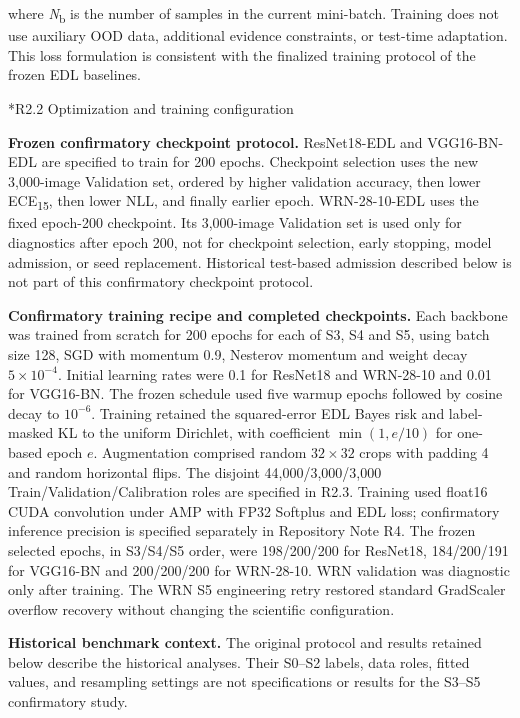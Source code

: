 \documentclass[11pt,a4paper]{article}
\makeatletter
\renewcommand\subsection{\@startsection{subsection}{2}{\z@}{-1.8ex plus -.5ex minus -.2ex}{.7ex plus .2ex}{\normalfont\normalsize\bfseries\raggedright}}
\makeatother
\begin{document}
where \emph{N}\textsubscript{b} is the number of samples in the current mini-batch. Training does not use auxiliary OOD data, additional evidence constraints, or test-time adaptation. This loss formulation is consistent with the finalized training protocol of the frozen EDL baselines.

\subsection*{R2.2 Optimization and training configuration}\label{s2.2-optimization-and-training-configuration}

\noindent\textbf{Frozen confirmatory checkpoint protocol.} ResNet18-EDL and VGG16-BN-EDL are specified to train for 200 epochs. Checkpoint selection uses the new 3,000-image Validation set, ordered by higher validation accuracy, then lower ECE\textsubscript{15}, then lower NLL, and finally earlier epoch. WRN-28-10-EDL uses the fixed epoch-200 checkpoint. Its 3,000-image Validation set is used only for diagnostics after epoch 200, not for checkpoint selection, early stopping, model admission, or seed replacement. Historical test-based admission described below is not part of this confirmatory checkpoint protocol.

\noindent\textbf{Confirmatory training recipe and completed checkpoints.} Each backbone was trained from scratch for 200 epochs for each of S3, S4 and S5, using batch size 128, SGD with momentum 0.9, Nesterov momentum and weight decay $5\times10^{-4}$. Initial learning rates were 0.1 for ResNet18 and WRN-28-10 and 0.01 for VGG16-BN. The frozen schedule used five warmup epochs followed by cosine decay to $10^{-6}$. Training retained the squared-error EDL Bayes risk and label-masked KL to the uniform Dirichlet, with coefficient $\min(1,e/10)$ for one-based epoch $e$. Augmentation comprised random $32\times32$ crops with padding 4 and random horizontal flips. The disjoint 44,000/3,000/3,000 Train/Validation/Calibration roles are specified in R2.3. Training used float16 CUDA convolution under AMP with FP32 Softplus and EDL loss; confirmatory inference precision is specified separately in Repository Note R4. The frozen selected epochs, in S3/S4/S5 order, were 198/200/200 for ResNet18, 184/200/191 for VGG16-BN and 200/200/200 for WRN-28-10. WRN validation was diagnostic only after training. The WRN S5 engineering retry restored standard GradScaler overflow recovery without changing the scientific configuration.

\noindent\textbf{Historical benchmark context.} The original protocol and results retained below describe the historical analyses. Their S0--S2 labels, data roles, fitted values, and resampling settings are not specifications or results for the S3--S5 confirmatory study.
\end{document}
